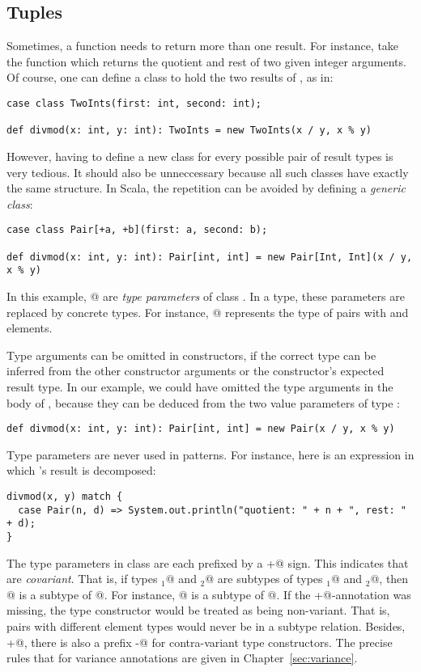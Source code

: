 \documentclass[11pt]{book}
\begin{document}
\subsection*{Tuples}

Sometimes, a function needs to return more than one result. For
instance, take the function \verb@divmod@ which returns the quotient
and rest of two given integer arguments.  Of course, one can
define a class to hold the two results of \verb@divmod@, as in:
\begin{verbatim}
case class TwoInts(first: int, second: int);

def divmod(x: int, y: int): TwoInts = new TwoInts(x / y, x % y)
\end{verbatim}
However, having to define a new class for every possible pair of
result types is very tedious. It should also be unneccessary because
all such classes have exactly the same structure. In Scala, the
repetition can be avoided by defining a {\em generic class}:
\begin{verbatim}
case class Pair[+a, +b](first: a, second: b);

def divmod(x: int, y: int): Pair[int, int] = new Pair[Int, Int](x / y, x % y)
\end{verbatim}
In this example, \verb@[a, b]@ are {\em type parameters} of class
\verb@Pair@. In a \verb@Pair@ type, these parameters are replaced by
concrete types. For instance, @ represents the
type of pairs with \verb@int@ and \verb@String@ elements.

Type arguments can be omitted in constructors, if the correct type can
be inferred from the other constructor arguments or the constructor's
expected result type. In our example, we could have omitted the type
arguments in the body of \verb@divmod@, because they can be deduced
from the two value parameters of type \verb@int@:
\begin{verbatim}
def divmod(x: int, y: int): Pair[int, int] = new Pair(x / y, x % y)
\end{verbatim}
Type parameters are never used in patterns. For instance, here is an
expression in which \verb@divmod@'s result is decomposed:
\begin{verbatim}
divmod(x, y) match {
  case Pair(n, d) => System.out.println("quotient: " + n + ", rest: " + d);
}
\end{verbatim}
The type parameters in class \verb@Pair@ are each prefixed by a
\verb@+@ sign.  This indicates that \verb@Pair@s are {\em
covariant}. That is, if types \verb@T$_1$@ and \verb@T$_2$@ are
subtypes of types \verb@S$_1$@ and \verb@S$_2$@, then
\verb@Pair[T$_1$, T$_2$]@ is a subtype of
\verb@Pair[S$_1$, S$_2$]@. For instance, @ is a
subtype of @. If the \verb@+@-annotation was
missing, the type constructor would be treated as being
non-variant. That is, pairs with different element types would never
be in a subtype relation. 
Besides, \verb@+@, there is also a prefix
\verb@-@ for contra-variant type constructors. 
The precise rules that
for variance annotations are given in Chapter~\ref{sec:variance}.
\end{document}
